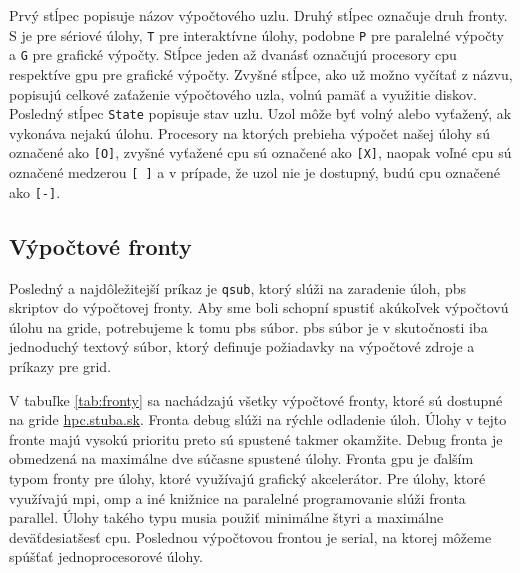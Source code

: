 Prvý stĺpec popisuje názov výpočtového uzlu. Druhý stĺpec označuje druh fronty. S je pre sériové úlohy, \texttt{T} pre interaktívne úlohy,
podobne \texttt{P} pre paralelné výpočty a \texttt{G} pre grafické výpočty.
Stĺpce jeden až dvanásť označujú procesory \acrshort{cpu} respektíve \acrshort{gpu} pre grafické výpočty.
Zvyšné stĺpce, ako už možno vyčítať z názvu, popisujú celkové zaťaženie výpočtového uzla, volnú pamäť a využitie diskov.
Posledný stĺpec \texttt{State} popisuje stav uzlu. Uzol môže byť volný alebo vyťažený, ak vykonáva nejakú úlohu.
Procesory na ktorých prebieha výpočet našej úlohy sú označené ako \texttt{[O]}, zvyšné vyťažené \acrshort{cpu} sú označené ako \texttt{[X]},
naopak voľné \acrshort{cpu} sú označené medzerou \texttt{[ ]} a v prípade, že uzol nie je dostupný, budú \acrshort{cpu} označené ako \texttt{[-]}.

\subsection{Výpočtové fronty}
Posledný a najdôležitejší príkaz je \texttt{qsub}, ktorý slúži na zaradenie úloh, \acrshort{pbs} skriptov do výpočtovej fronty.
Aby sme boli schopní spustiť akúkoľvek výpočtovú úlohu na gride, potrebujeme k tomu \acrfull{pbs} súbor.
\acrshort{pbs} súbor je v skutočnosti iba jednoduchý textový súbor, ktorý definuje požiadavky na výpočtové zdroje a príkazy pre grid.

V tabuľke \ref{tab:fronty} sa nachádzajú všetky výpočtové fronty, ktoré sú dostupné na gride \url{hpc.stuba.sk}.
Fronta debug slúži na rýchle odladenie úloh. Úlohy v tejto fronte majú vysokú prioritu preto sú spustené takmer okamžite.
Debug fronta je obmedzená na maximálne dve súčasne spustené úlohy. Fronta gpu je ďalším typom fronty pre úlohy, ktoré využívajú grafický akcelerátor.
Pre úlohy, ktoré využívajú \acrshort{mpi}, \acrshort{omp} a iné knižnice na paralelné programovanie slúži fronta parallel.
Úlohy takého typu musia použiť minimálne štyri a maximálne deväťdesiatšesť \acrshort{cpu}.
Poslednou výpočtovou frontou je serial, na ktorej môžeme spúšťať jednoprocesorové úlohy. 

